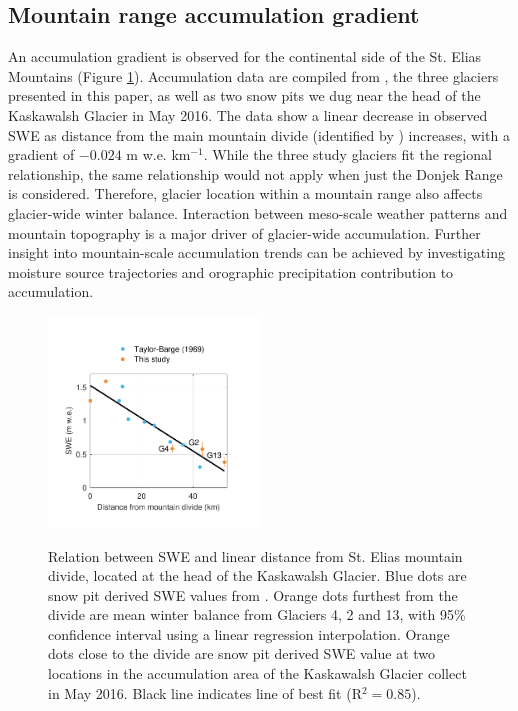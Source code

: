 \documentclass[twocolumn, letterpaper]{igs}
\begin{document}
\subsection{Mountain range accumulation gradient}

An accumulation gradient is observed for the continental side of the St. Elias Mountains (Figure \ref{fig:AccumGrad}). Accumulation data are compiled from \cite{Taylor1969}, the three glaciers presented in this paper, as well as two snow pits we dug near the head of the Kaskawalsh Glacier in May 2016. The data show a linear decrease in observed SWE as distance from the main mountain divide (identified by \cite{Taylor1969}) increases, with a gradient of $-0.024$ m w.e. km$^{-1}$. While the three study glaciers fit the regional relationship, the same relationship would not apply when just the Donjek Range is considered. Therefore, glacier location within a mountain range also affects glacier-wide winter balance. Interaction between meso-scale weather patterns and mountain topography is a major driver of glacier-wide accumulation. Further insight into mountain-scale accumulation trends can be achieved by investigating moisture source trajectories and orographic precipitation contribution to accumulation. 

\begin{figure}
	\centering
	\includegraphics[width =0.5\textwidth]{AccumGrad.pdf}\\
	\caption{Relation between SWE and linear distance from St. Elias mountain divide, located at the head of the Kaskawalsh Glacier. Blue dots are snow pit derived SWE values from \cite{Taylor1969}. Orange dots furthest from the divide are mean winter balance from Glaciers 4, 2 and 13, with 95\% confidence interval using a linear regression interpolation. Orange dots close to the divide are snow pit derived SWE value at two locations in the accumulation area of the Kaskawalsh Glacier collect in May 2016. Black line indicates line of best fit (R$^2=0.85$).}
	\label{fig:AccumGrad}
\end{figure}
\end{document}
